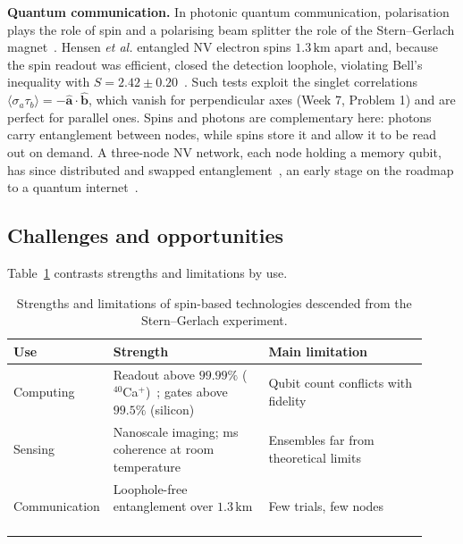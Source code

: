 \textbf{Quantum communication.} In photonic quantum communication, polarisation plays the role of spin and a polarising beam splitter the role of the Stern--Gerlach magnet~\cite{sakurai2020}. Hensen \emph{et al.} entangled NV electron spins $1.3\,\mathrm{km}$ apart and, because the spin readout was efficient, closed the detection loophole, violating Bell's inequality with $S=2.42\pm0.20$~\cite{hensen2015}. Such tests exploit the singlet correlations $\langle\sigma_a\tau_b\rangle=-\hat{\mathbf a}\cdot\hat{\mathbf b}$, which vanish for perpendicular axes (Week 7, Problem 1) and are perfect for parallel ones. Spins and photons are complementary here: photons carry entanglement between nodes, while spins store it and allow it to be read out on demand. A three-node NV network, each node holding a memory qubit, has since distributed and swapped entanglement~\cite{pompili2021}, an early stage on the roadmap to a quantum internet~\cite{wehner2018}.

\subsection{Challenges and opportunities}

Table~\ref{tab:sg} contrasts strengths and limitations by use.

\begin{table}[H]
\centering\small
\renewcommand{\arraystretch}{1.25}
\begin{tabular}{@{}>{\raggedright\arraybackslash}p{0.17\linewidth}>{\raggedright\arraybackslash}p{0.37\linewidth}>{\raggedright\arraybackslash}p{0.38\linewidth}@{}}
\hline
\textbf{Use} & \textbf{Strength} & \textbf{Main limitation}\\
\hline
Computing & Readout above $99.99\%$ ($^{40}$Ca$^+$)~\cite{myerson2008}; gates above $99.5\%$ (silicon)~\cite{xue2022} & Qubit count conflicts with fidelity~\cite{philips2022}\\
Sensing & Nanoscale imaging; ms coherence at room temperature~\cite{rondin2014,balasubramanian2009} & Ensembles far from theoretical limits~\cite{barry2020}\\
Communication & Loophole-free entanglement over $1.3\,\mathrm{km}$~\cite{hensen2015} & Few trials, few nodes~\cite{hensen2015,pompili2021}\\
\hline
\end{tabular}
\caption{Strengths and limitations of spin-based technologies descended from the Stern--Gerlach experiment.}
\label{tab:sg}
\end{table}

